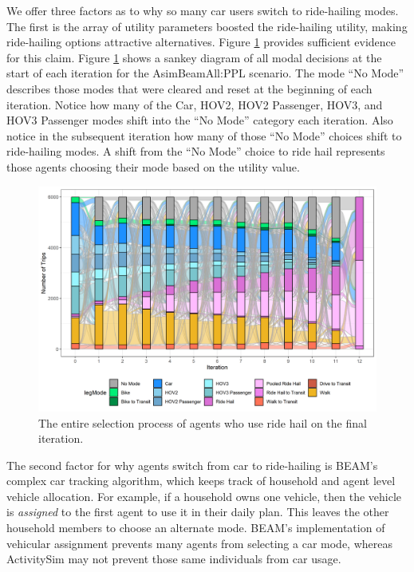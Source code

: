 \documentclass[fancy, masters]{byuthesis}
\begin{document}
We offer three factors as to why so many car users switch to ride-hailing modes. The first is the array of utility parameters boosted the ride-hailing utility, making ride-hailing options attractive alternatives. Figure \ref{fig:sankey} provides sufficient evidence for this claim. Figure \ref{fig:sankey} shows a sankey diagram of all modal decisions at the start of each iteration for the AsimBeamAll:PPL scenario. The mode ``No Mode'' describes those modes that were cleared and reset at the beginning of each iteration. Notice how many of the Car, HOV2, HOV2 Passenger, HOV3, and HOV3 Passenger modes shift into the ``No Mode'' category each iteration. Also notice in the subsequent iteration how many of those ``No Mode'' choices shift to ride-hailing modes. A shift from the ``No Mode'' choice to ride hail represents those agents choosing their mode based on the utility value.

\begin{figure}

\centerline{\includegraphics{planshifts.png}}
\caption{The entire selection process of agents who use ride hail on the final iteration.}
\label{fig:sankey}

\end{figure}

The second factor for why agents switch from car to ride-hailing is BEAM's complex car tracking algorithm, which keeps track of household and agent level vehicle allocation. For example, if a household owns one vehicle, then the vehicle is \emph{assigned} to the first agent to use it in their daily plan. This leaves the other household members to choose an alternate mode. BEAM's implementation of vehicular assignment prevents many agents from selecting a car mode, whereas ActivitySim may not prevent those same individuals from car usage.
\end{document}
